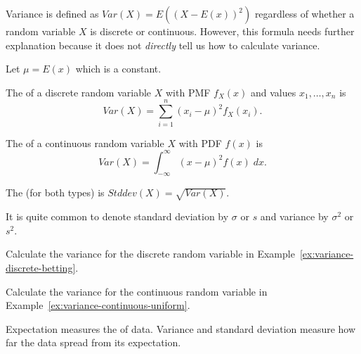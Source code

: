 \documentclass[../main.tex]{subfiles}
\begin{document}
Variance is defined as \(Var(X) = E( (X - E(x))^{2} )\) regardless of whether a random variable \(X\) is discrete or continuous. However, this formula needs further explanation because it does not \emph{directly} tell us how to calculate variance.
\begin{definition}
  Let \(\mu = E(x)\) which is a constant.

  The  of a discrete random variable \(X\) with PMF \(f_{X}(x)\) and values \(x_{1}, \ldots, x_{n}\) is 
  \begin{equation} \label{def:variance-discrete}
    Var(X) = \sum_{i=1}^{n} (x_{i} - \mu)^{2} f_{X}(x_{i}).
  \end{equation}

  The  of a continuous random variable \(X\) with PDF \(f(x)\) is 
  \begin{equation} \label{def:variance-continuous}
    Var(X) = \int_{-\infty}^{\infty} (x - \mu)^{2} f(x) \;dx.
  \end{equation}

  The  (for both types) is \(Stddev(X) = \sqrt{Var(X)}\).

  It is quite common to denote standard deviation by \(\sigma\) or \(s\) and variance by \(\sigma^{2}\) or \(s^{2}\).
\end{definition}

\begin{example}
  Calculate the variance for the discrete random variable in Example~\ref{ex:variance-discrete-betting}.

\end{example}

\begin{example}
  Calculate the variance for the continuous random variable in Example~\ref{ex:variance-continuous-uniform}.

\end{example}
\clearpage

\faStar{} Expectation measures the  of data. Variance and standard deviation measure how far the data spread from its expectation.
\end{document}
